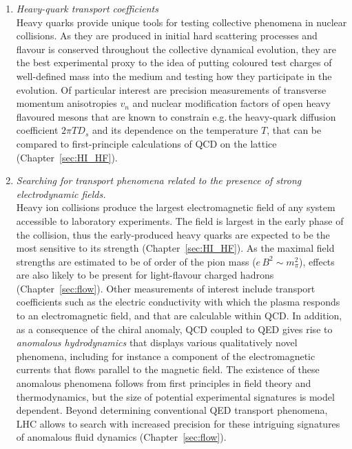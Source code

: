 \documentclass[../report.tex]{subfiles}
\begin{document}
\begin{enumerate}
\item {\it Heavy-quark transport coefficients}\\ Heavy quarks provide unique tools for testing collective phenomena in nuclear collisions. As they are produced in initial hard scattering processes and flavour is conserved throughout the collective dynamical evolution, they are the best experimental proxy to the idea of putting coloured test charges of well-defined mass into the medium and testing how they participate in the evolution. Of particular interest are precision measurements of transverse momentum anisotropies $v_n$ and nuclear modification factors of open heavy flavoured mesons that are known to constrain e.g.\,the heavy-quark diffusion coefficient $2\pi T D_s$ and its dependence on the temperature $T$, that can be compared to first-principle calculations of QCD on the lattice (Chapter~\ref{sec:HI_HF}).
\item {\it Searching for transport phenomena related to the presence of strong electrodynamic fields.}\\ Heavy ion collisions produce the largest electromagnetic field of any system accessible to laboratory experiments. The field is largest in the early phase of the collision, thus the early-produced heavy quarks are expected to be the most sensitive to its strength (Chapter~\ref{sec:HI_HF}).
As the maximal field strengths are estimated to be of order of the pion mass ($e\, B^2 \sim m_\pi^2$), effects are also likely to be present for light-flavour charged hadrons (Chapter~\ref{sec:flow}). Other measurements of interest include transport coefficients such as the electric conductivity with which the plasma responds to an electromagnetic field, and that are calculable within QCD. In addition, as a consequence of the chiral anomaly, QCD coupled to QED gives rise to {\it anomalous hydrodynamics} that displays various qualitatively novel phenomena, including for instance a component of the electromagnetic currents that flows parallel to the magnetic field. The existence of these anomalous phenomena follows from first principles in field theory and thermodynamics, but the size of potential experimental signatures is model dependent.  Beyond determining conventional QED transport phenomena, LHC allows to search with increased precision for these intriguing signatures of anomalous fluid dynamics (Chapter~\ref{sec:flow}). 
\end{enumerate}
\end{document}
